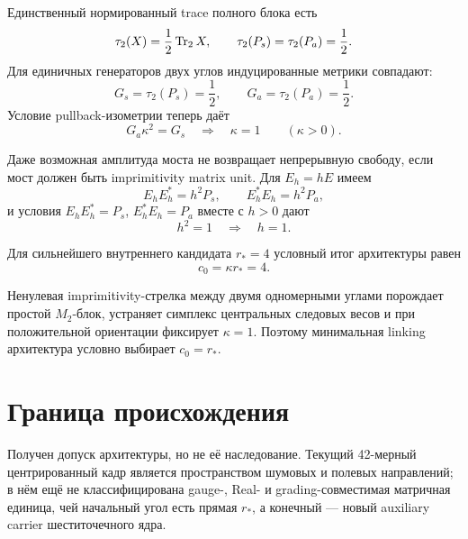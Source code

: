 Единственный нормированный trace полного блока есть
\begin{equation}
 \tau_2(X)=\frac12\operatorname{Tr}_2X,
 \qquad
 \tau_2(P_s)=\tau_2(P_a)=\frac12.
 \label{eq:v8-baryon-c0-linking-unique-trace}
\end{equation}
Для единичных генераторов двух углов индуцированные метрики совпадают:
\begin{equation}
 G_s=\tau_2(P_s)=\frac12,
 \qquad
 G_a=\tau_2(P_a)=\frac12.
 \label{eq:v8-baryon-c0-linking-corner-metrics}
\end{equation}
Условие pullback-изометрии теперь даёт
\begin{equation}
 G_a\kappa^2=G_s
 \quad\Longrightarrow\quad
 \kappa=1
 \qquad(\kappa>0).
 \label{eq:v8-baryon-c0-linking-kappa-one}
\end{equation}

Даже возможная амплитуда моста не возвращает непрерывную свободу, если мост
должен быть imprimitivity matrix unit. Для $E_h=hE$ имеем
\begin{equation}
 E_hE_h^*=h^2P_s,
 \qquad E_h^*E_h=h^2P_a,
 \label{eq:v8-baryon-c0-scaled-bridge-products}
\end{equation}
и условия $E_hE_h^*=P_s$, $E_h^*E_h=P_a$ вместе с $h>0$ дают
\begin{equation}
 h^2=1\quad\Longrightarrow\quad h=1.
 \label{eq:v8-baryon-c0-imprimitivity-fixes-bridge-scale}
\end{equation}

Для сильнейшего внутреннего кандидата $r_*=4$ условный итог архитектуры
равен
\begin{equation}
 c_0=\kappa r_*=4.
 \label{eq:v8-baryon-c0-linking-conditional-value}
\end{equation}

\begin{theorem}
Ненулевая imprimitivity-стрелка между двумя одномерными углами порождает
простой $M_2$-блок, устраняет симплекс центральных следовых весов и при
положительной ориентации фиксирует $\kappa=1$. Поэтому минимальная linking
архитектура условно выбирает $c_0=r_*$.
\end{theorem}

\section{Граница происхождения}

Получен допуск архитектуры, но не её наследование. Текущий 42-мерный
центрированный кадр является пространством шумовых и полевых направлений;
в нём ещё не классифицирована gauge-, Real- и grading-совместимая матричная
единица, чей начальный угол есть прямая $r_*$, а конечный --- новый
auxiliary carrier шеститочечного ядра.

